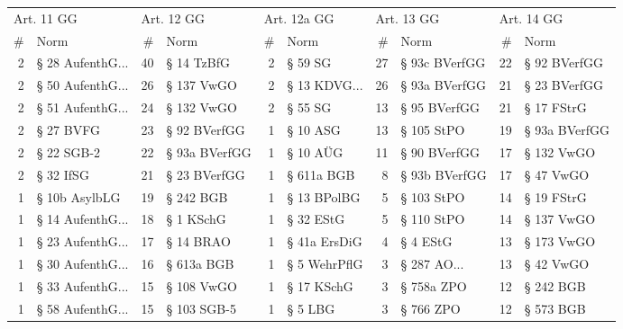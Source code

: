 \begin{tabular}{rlrlrlrlrl}
\toprule
\multicolumn{2}{l}{Art. 11 GG} & \multicolumn{2}{l}{Art. 12 GG} & \multicolumn{2}{l}{Art. 12a GG} & \multicolumn{2}{l}{Art. 13 GG} & \multicolumn{2}{l}{Art. 14 GG} \\
         \# &               Norm &          \# &          Norm &           \# &           Norm &          \# &          Norm &          \# &          Norm \\
\midrule
         2 & § 28 AufenthG... &         40 &    § 14 TzBfG &           2 &        § 59 SG &         27 & § 93c BVerfGG &         22 &  § 92 BVerfGG \\
         2 & § 50 AufenthG... &         26 &    § 137 VwGO &           2 & § 13 KDVG... &         26 & § 93a BVerfGG &         21 &  § 23 BVerfGG \\
         2 & § 51 AufenthG... &         24 &    § 132 VwGO &           2 &        § 55 SG &         13 &  § 95 BVerfGG &         21 &    § 17 FStrG \\
         2 &          § 27 BVFG &         23 &  § 92 BVerfGG &           1 &       § 10 ASG &         13 &    § 105 StPO &         19 & § 93a BVerfGG \\
         2 &         § 22 SGB-2 &         22 & § 93a BVerfGG &           1 &       § 10 AÜG &         11 &  § 90 BVerfGG &         17 &    § 132 VwGO \\
         2 &          § 32 IfSG &         21 &  § 23 BVerfGG &           1 &     § 611a BGB &          8 & § 93b BVerfGG &         17 &     § 47 VwGO \\
         1 &      § 10b AsylbLG &         19 &     § 242 BGB &           1 &    § 13 BPolBG &          5 &    § 103 StPO &         14 &    § 19 FStrG \\
         1 & § 14 AufenthG... &         18 &     § 1 KSchG &           1 &      § 32 EStG &          5 &    § 110 StPO &         14 &    § 137 VwGO \\
         1 & § 23 AufenthG... &         17 &     § 14 BRAO &           1 &   § 41a ErsDiG &          4 &      § 4 EStG &         13 &    § 173 VwGO \\
         1 & § 30 AufenthG... &         16 &    § 613a BGB &           1 &   § 5 WehrPflG &          3 & § 287 AO... &         13 &     § 42 VwGO \\
         1 & § 33 AufenthG... &         15 &    § 108 VwGO &           1 &     § 17 KSchG &          3 &    § 758a ZPO &         12 &     § 242 BGB \\
         1 & § 58 AufenthG... &         15 &   § 103 SGB-5 &           1 &        § 5 LBG &          3 &     § 766 ZPO &         12 &     § 573 BGB \\

\end{tabular}
